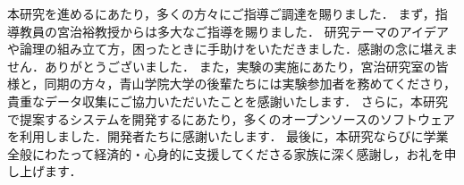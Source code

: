 本研究を進めるにあたり，多くの方々にご指導ご調達を賜りました．
まず，指導教員の宮治裕教授からは多大なご指導を賜りました．
研究テーマのアイデアや論理の組み立て方，困ったときに手助けをいただきました．感謝の念に堪えません．ありがとうございました．
また，実験の実施にあたり，宮治研究室の皆様と，同期の方々，青山学院大学の後輩たちには実験参加者を務めてくださり，貴重なデータ収集にご協力いただいたことを感謝いたします．
さらに，本研究で提案するシステムを開発するにあたり，多くのオープンソースのソフトウェアを利用しました．開発者たちに感謝いたします．
最後に，本研究ならびに学業全般にわたって経済的・心身的に支援してくださる家族に深く感謝し，お礼を申し上げます．